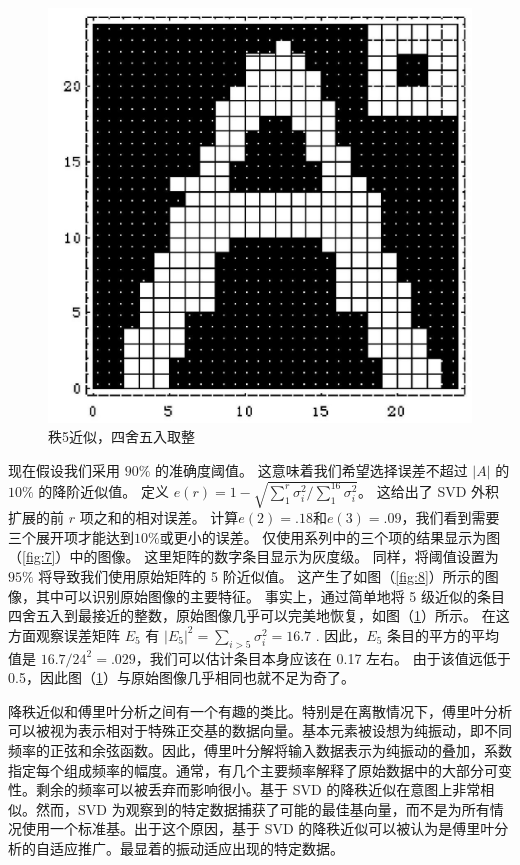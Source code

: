 \documentclass[11pt,a4paper,twoside]{article}
\begin{document}
\begin{CJK}{UTF8}{gbsn}
\begin{figure}[htbp]%
  \centering
  \includegraphics[totalheight=2in]{./fig/9.jpg}
  \caption{秩5近似，四舍五入取整} 
  \label{fig:9}
\end{figure}
现在假设我们采用 $90 \%$ 的准确度阈值。 这意味着我们希望选择误差不超过 $|A|$ 的 $10 \%$ 的降阶近似值。 定义 $e(r)=1-\sqrt{\sum_{1}^{r} \sigma_{i}^{2} / \sum_{1}^{16} \sigma_{i}^{2}} $。 这给出了 SVD 外积扩展的前 $r$ 项之和的相对误差。 计算$e(2)=.18$和$e(3)=.09$，我们看到需要三个展开项才能达到$10\%$或更小的误差。 仅使用系列中的三个项的结果显示为图（\ref{fig:7}）中的图像。 这里矩阵的数字条目显示为灰度级。 同样，将阈值设置为 $95 \%$ 将导致我们使用原始矩阵的 5 阶近似值。 这产生了如图（\ref{fig:8}）所示的图像，其中可以识别原始图像的主要特征。 事实上，通过简单地将 5 级近似的条目四舍五入到最接近的整数，原始图像几乎可以完美地恢复，如图（\ref{fig:9}）所示。 在这方面观察误差矩阵 $E_{5}$ 有 $\left|E_{5}\right|^{2}=\sum_{i>5} \sigma_{i}^{2}=16.7$ . 因此，$E_{5}$ 条目的平方的平均值是 $16.7 / 24^{2}=.029$，我们可以估计条目本身应该在 0.17 左右。 由于该值远低于 0.5，因此图（\ref{fig:9}）与原始图像几乎相同也就不足为奇了。

降秩近似和傅里叶分析之间有一个有趣的类比。特别是在离散情况下，傅里叶分析可以被视为表示相对于特殊正交基的数据向量。基本元素被设想为纯振动，即不同频率的正弦和余弦函数。因此，傅里叶分解将输入数据表示为纯振动的叠加，系数指定每个组成频率的幅度。通常，有几个主要频率解释了原始数据中的大部分可变性。剩余的频率可以被丢弃而影响很小。基于 SVD 的降秩近似在意图上非常相似。然而，SVD 为观察到的特定数据捕获了可能的最佳基向量，而不是为所有情况使用一个标准基。出于这个原因，基于 SVD 的降秩近似可以被认为是傅里叶分析的自适应推广。最显着的振动适应出现的特定数据。


\end{CJK}
\end{document}
